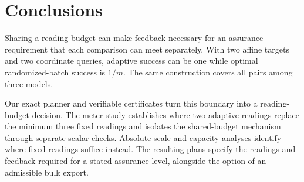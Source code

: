 \section{Conclusions}
Sharing a reading budget can make feedback necessary for an assurance
requirement that each comparison can meet separately. With two affine
targets and two coordinate queries, adaptive success can be one while
optimal randomized-batch success is $1/m$. The same construction covers
all pairs among three models.

Our exact planner and verifiable certificates turn this boundary into a
reading-budget decision. The meter study establishes where two adaptive
readings replace the minimum three fixed readings and isolates the
shared-budget mechanism through separate scalar checks. Absolute-scale
and capacity analyses identify where fixed readings suffice instead.
The resulting plans specify the readings and feedback required for a stated
assurance level, alongside the option of an admissible bulk export.
